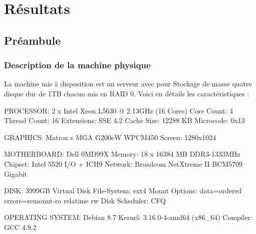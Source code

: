 \chapter{Résultats}
\section{Préambule}
\subsection{Description de la machine physique }
La machine mis à disposition est un serveur avec pour Stockage de masse quatre disque dur de 1TB chacun mis en RAID 0. Voici en détails les caractéristiques :


  PROCESSOR:          2 x Intel Xeon L5630 @ 2.13GHz (16 Cores)\newline
    Core Count:       4\newline
    Thread Count:     16\newline
    Extensions:       SSE 4.2\newline
    Cache Size:       12288 KB\newline
    Microcode:        0x13\newline

  GRAPHICS:           Matrox s MGA G200eW WPCM450\newline
    Screen:           1280x1024\newline

  MOTHERBOARD:        Dell 0MD99X\newline
    Memory:           18 x 16384 MB DDR3-1333MHz\newline
    Chipset:          Intel 5520 I/O + ICH9\newline
    Network:          Broadcom NetXtreme II BCM5709 Gigabit\newline

  DISK:               3999GB Virtual Disk\newline
    File-System:      ext4\newline
    Mount Options:    data=ordered errors=remount-ro relatime rw\newline
    Disk Scheduler:   CFQ\newline

  OPERATING SYSTEM:   Debian 8.7\newline
    Kernel:           3.16.0-4-amd64 (x86\_64)\newline
    Compiler:         GCC 4.9.2\newline

